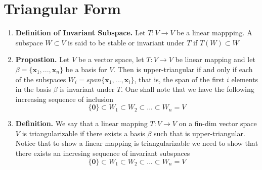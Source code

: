 \documentclass[oneside, 12pt]{book}
\newcommand{\settag}[1]{\renewcommand{\theenumi}{#1}}
\newcommand{\tbf}[1]{\textbf{#1}}
\newcommand{\trans}[3]{$#1:#2\rightarrow{}#3$}
\newcommand{\map}[3]{\text{$\left[#1\right]_{#2}^{#3}$}}
\newcommand{\para}[1]{\item \tbf{#1}}
\newcommand{\vx}{\mathbf{x}}
\newcommand{\vzero}{\mathbf{0}}
\begin{document}
\section{Triangular Form}
\begin{enumerate}
    \settag{6.1.2}
    \para{Definition of Invariant Subspace.} Let \trans{T}{V}{V} be a linear mappping. A subspace 
    $W\subset V$ is said to be stable or invariant under $T$ if $T(W)\subset W$

    \settag{6.1.4}
    \para{Propostion.} Let $V$ be a vector space, let \trans{T}{V}{V} be linear mapping and let 
    $\beta=\{\vx_1,...,\vx_n\}$ be a basis for $V$. Then \map{T}{\beta}{\beta} is upper-triangular 
    if and only if each of the subspaces $W_i = span\{ \vx_1,...,\vx_i \}$, that is, 
    the span of the first $i$ elements in the basis $\beta$ is invariant under $T$. One shall note that
    we have the following increasing sequence of inclusion
    \begin{equation*}
        \{\vzero\} \subset W_1 \subset W_2 \subset ... \subset W_n = V
    \end{equation*}

    \settag{6.1.5}
    \para{Definition.} We say that a linear mapping \trans{T}{V}{V} on a fin-dim vector space $V$ is triangularizable if there exists
    a basis $\beta$ such that \map{T}{\beta}{\beta} is upper-triangular. Notice that to show a linear mapping is triangularizable
    we need to show that there exists an incresing sequence of invariant subspaces
    \begin{equation*}
        \{\vzero\} \subset W_1 \subset W_2 \subset ... \subset W_n = V
    \end{equation*}


\end{enumerate}
\end{document}
